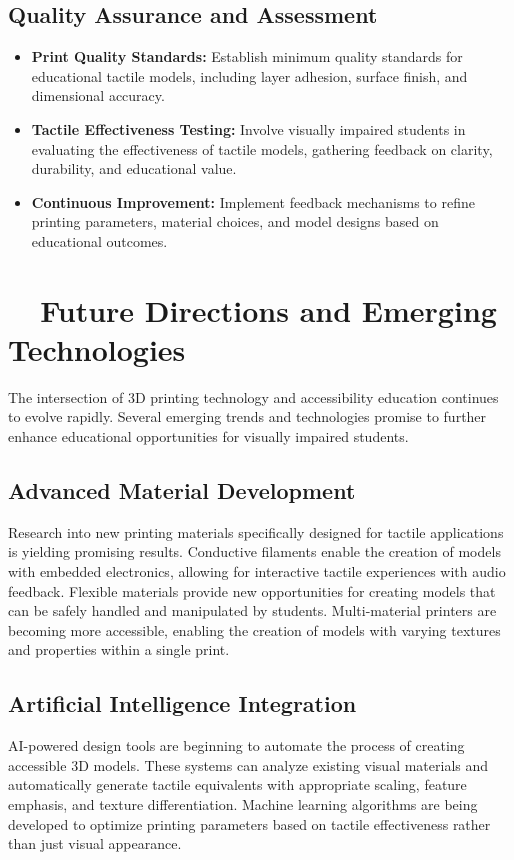 \subsection{Quality Assurance and Assessment}
\begin{itemize}
	\item \textbf{Print Quality Standards:} Establish minimum quality standards for educational tactile models, including layer adhesion, surface finish, and dimensional accuracy.
	\item \textbf{Tactile Effectiveness Testing:} Involve visually impaired students in evaluating the effectiveness of tactile models, gathering feedback on clarity, durability, and educational value.
	\item \textbf{Continuous Improvement:} Implement feedback mechanisms to refine printing parameters, material choices, and model designs based on educational outcomes.
\end{itemize}

\section{~~Future Directions and Emerging Technologies}\label{ch5:sec:future-directions}

The intersection of 3D printing technology and accessibility education continues to evolve rapidly. Several emerging trends and technologies promise to further enhance educational opportunities for visually impaired students.

\subsection{Advanced Material Development}
Research into new printing materials specifically designed for tactile applications is yielding promising results. Conductive filaments enable the creation of models with embedded electronics, allowing for interactive tactile experiences with audio feedback. Flexible materials provide new opportunities for creating models that can be safely handled and manipulated by students. Multi-material printers are becoming more accessible, enabling the creation of models with varying textures and properties within a single print.

\subsection{Artificial Intelligence Integration}
AI-powered design tools are beginning to automate the process of creating accessible 3D models. These systems can analyze existing visual materials and automatically generate tactile equivalents with appropriate scaling, feature emphasis, and texture differentiation. Machine learning algorithms are being developed to optimize printing parameters based on tactile effectiveness rather than just visual appearance.

